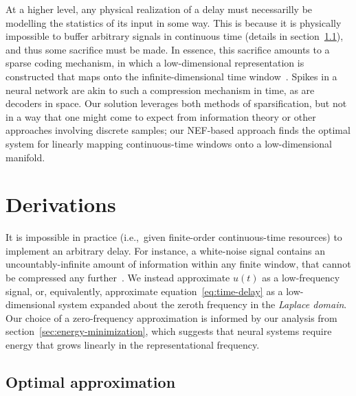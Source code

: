 At a higher level, any physical realization of a delay must necessarilly be modelling the statistics of its input in some way.
This is because it is physically impossible to buffer arbitrary signals in continuous time (details in section~\ref{sec:nef-delay}), and thus some sacrifice must be made.
In essence, this sacrifice amounts to a sparse coding mechanism, in which a low-dimensional representation is constructed that maps onto the infinite-dimensional time window~\citep{blumensath2009sampling}.
Spikes in a neural network are akin to such a compression mechanism in time, as are decoders in space.
Our solution leverages both methods of sparsification, but not in a way that one might come to expect from information theory or other approaches involving discrete samples; our NEF-based approach finds the optimal system for linearly mapping continuous-time windows onto a low-dimensional manifold.

\section{Derivations}

It is impossible in practice (i.e.,~given finite-order continuous-time resources) to implement an arbitrary delay.
For instance, a white-noise signal contains an uncountably-infinite amount of information within any finite window, that cannot be compressed any further~\citep{cover2012elements}.
We instead approximate $u(t)$ as a low-frequency signal, or, equivalently, approximate equation~\ref{eq:time-delay} as a low-dimensional system expanded about the zeroth frequency in the \emph{Laplace domain}.
Our choice of a zero-frequency approximation is informed by our analysis from section~\ref{sec:energy-minimization}, which suggests that neural systems require energy that grows linearly in the representational frequency.

\subsection{Optimal approximation}
\label{sec:nef-delay}

